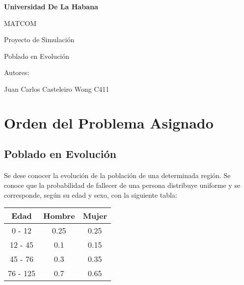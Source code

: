 \documentclass{article}
\begin{document}
    \begin{titlepage}
        \centering
        {\bfseries\LARGE Universidad De La Habana \par}
        \vspace{1cm}
        {\Large MATCOM \par}
        \vspace{3cm}
        {\Huge Proyecto de Simulación \par}
        \vspace{1cm}
        {\Large Poblado en Evolución }
        \vfill
        {\Large Autores: \par}
        {\Large Juan Carlos Casteleiro Wong C411 \par}  
        {\Large  \par}

        \vfill
    \end{titlepage}

    

    \tableofcontents{} 

    \section{Orden del Problema Asignado}
        \subsection{ Poblado en Evolución}
        \paragraph{}
            Se dese conocer la evolución de la población de una determinada región.
            Se conoce que la probabilidad de fallecer de una persona distribuye uniforme
            y se corresponde, según su edad y sexo, con la siguiente tabla:

            \begin{table}[h!]
                \begin{center}
                \begin{tabular}{| c | c | c |}
                \hline
                Edad & Hombre & Mujer \\ \hline
                0 - 12 & 0.25 & 0.25 \\ \hline
                12 - 45  & 0.1 & 0.15 \\ \hline
                45 - 76  & 0.3 & 0.35 \\ \hline
                76 - 125  & 0.7 & 0.65 \\ \hline
                \end{tabular}
                \end{center}
            \end{table}
\end{document}
